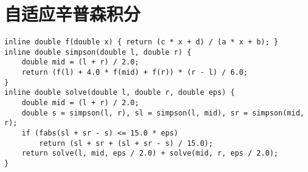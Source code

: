 \section{自适应辛普森积分}
\begin{verbatim}
inline double f(double x) { return (c * x + d) / (a * x + b); }
inline double simpson(double l, double r) {
    double mid = (l + r) / 2.0;
    return (f(l) + 4.0 * f(mid) + f(r)) * (r - l) / 6.0;
}
inline double solve(double l, double r, double eps) {
    double mid = (l + r) / 2.0;
    double s = simpson(l, r), sl = simpson(l, mid), sr = simpson(mid, r);
    if (fabs(sl + sr - s) <= 15.0 * eps)
        return (sl + sr + (sl + sr - s) / 15.0);
    return solve(l, mid, eps / 2.0) + solve(mid, r, eps / 2.0);
}
\end{verbatim}
